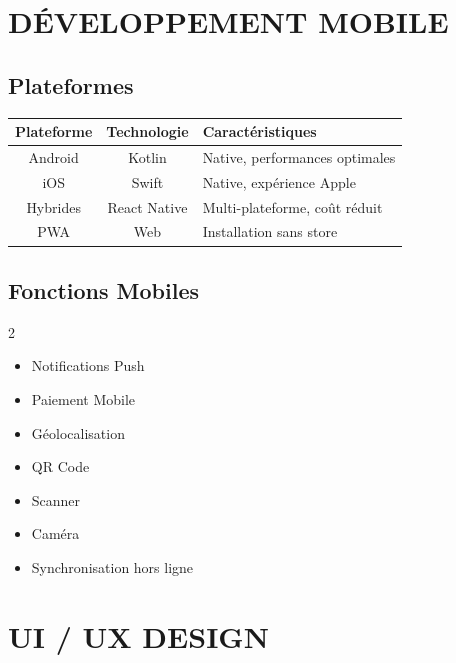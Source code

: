 \documentclass[12pt,a4paper,oneside]{book}
\begin{document}
\chapter{DÉVELOPPEMENT MOBILE}

\section{Plateformes}
\begin{center}
\begin{tabular}{|c|c|p{8cm}|}
\hline
\rowcolor{electroncyan}
\color{white}\textbf{Plateforme} & \color{white}\textbf{Technologie} & \color{white}\textbf{Caractéristiques} \\
\hline
Android & Kotlin & Native, performances optimales \\
\hline
iOS & Swift & Native, expérience Apple \\
\hline
Hybrides & React Native & Multi-plateforme, coût réduit \\
\hline
PWA & Web & Installation sans store \\
\hline
\end{tabular}
\end{center}

\section{Fonctions Mobiles}
\begin{multicols}{2}
\begin{itemize}
\item Notifications Push
\item Paiement Mobile
\item Géolocalisation
\item QR Code
\item Scanner
\item Caméra
\item Synchronisation hors ligne
\end{itemize}
\end{multicols}

\chapter{UI / UX DESIGN}
\end{document}
